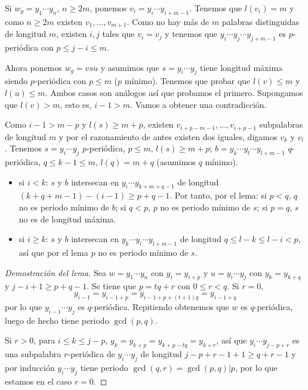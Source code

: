 \documentclass[twoside, 11pt]{article}
\begin{document}
\begin{dem}
Si $w_g=y_1\cdots y_n$, $n\geq 2m$, ponemos $v_i=y_i\cdots y_{i+m-1}$. Tenemos que $l(v_i)=m$ y como $n\geq 2m$ existen $v_1,\dots, v_{m+1}$. Como no hay más de $m$ palabras distinguidas de longitud $m$, existen $i,j$ tales que $v_i=v_j$ y tenemos que $y_i\cdots y_j\cdots y_{j+m-1}$ es $p$-periódica con $p\leq j-i\leq m$.

Ahora ponemos $w_g=vsu$ y asumimos que $s=y_i\cdots y_j$ tiene longitud máxima siendo $p$-periódica con $p\leq m$ ($p$ mínimo). Tenemos que probar que $l(v)\leq m$ y $l(u)\leq m$. Ambos casos son análogos así que probamos el primero. Supongamos que $l(v)>m$, esto es, $i-1>m$. Vamos a obtener una contradicción. 

Como $i-1>m-p$ y $l(s)\geq m+p$, existen $v_{i+p-m-1},\dots, v_{i+p-1}$ subpalabras de longitud $m$ y por el razonamiento de antes existen dos iguales, digamos $v_k$ y $v_l$. Tenemos $s=y_i\cdots y_j$ $p$-periódica, $p\leq m$, $l(s)\geq m+p$; $b=y_k\cdots y_l\cdots y_{l+m-1}$ $q$-periódica, $q\leq k-1\leq m$, $l(q)=m+q$ (asumimos $q$ mínimo). 

\begin{itemize}
\item si $i<k$: $s$ y $b$ intersecan en $y_i\cdots y_{k+m+q-1}$ de longitud $(k+q+m-1)-(i-1)\geq p+q-1$. Por tanto, por el lema: si $p<q$, $q$ no es periodo mínimo de $b$; si $q<p$, $p$ no es periodo mínimo de $s$; si $p=q$, $s$ no es de longitud máxima.
\item si $i\geq k$: $s$ y $b$ intersecan en $y_k\cdots y_l\cdots y_{l+m-1}$ de longitud $q\leq l-k\leq l-i<p$, así que por el lema $p$ no es periodo mínimo de $s$. 
\end{itemize}

\QED
\end{dem}

\begin{proof}[Demostración del lema]
Sea $w=y_1\cdots y_n$ con $y_i=y_{i+p}$ y $u=y_i\cdots y_j$ con $y_k=y_{k+q}$ y $j-i+1\geq p+q-1$. Se tiene que $p=tq+r$ con $0\leq r<q$. Si $r=0$, 
\[
y_{i-1}=y_{i-1+p}=y_{i-1+p+(t+1)q}=y_{i-1+q}
\]
por lo que $y_{i-1}\cdots y_j$ es $q$-periódica. Repitiendo obtenemos que $w$ es $q$-periódica, luego de hecho tiene periodo $\gcd(p,q)$. 

Si $r>0$, para $i\leq k\leq j-p$, $y_k=y_{k+p}=y_{k+p-tq}=y_{k+r}$, así que $y_i\cdots y_{j-p+r}$ es una subpalabra $r$-periódica de $y_i\cdots y_j$ de longitud $j-p+r-1+1\geq q+r-1$ y por inducción $y_i\cdots y_j$ tiene periodo $\gcd(q,r)=\gcd(p,q)|p$, por lo que estamos en el caso $r=0$. 
\end{proof}
\end{document}
